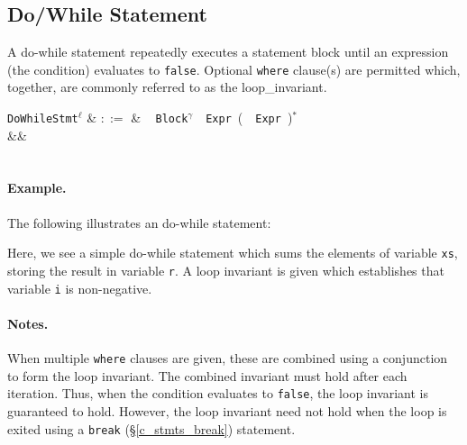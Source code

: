 
\subsection{Do/While Statement}
\label{c_stmts_do_while}
A do-while statement repeatedly executes a statement block until an expression (the condition) evaluates to \lstinline{false}.  Optional \lstinline{where} clause(s) are permitted which, together, are commonly referred to as the \gls{loop_invariant}.  

\begin{syntax}
  \verb+DoWhileStmt+$^\ell$ & $::=$ & \ \token{:}
  \verb+Block+$^\gamma$\ \ \verb+Expr+\ \big(\
  \ \verb+Expr+\ \big)$^*$\\
&&\\
\\
\end{syntax}

\paragraph{Example.} The following illustrates an do-while statement:



Here, we see a simple do-while statement which sums the elements of variable \lstinline{xs}, storing the result in variable \lstinline{r}.  A loop invariant is given which establishes that variable \lstinline{i} is non-negative.

\paragraph{Notes.}   When multiple \lstinline{where} clauses are given, these are combined using a conjunction to form the loop invariant.  The combined invariant must hold after each iteration.  Thus, when the condition evaluates to \lstinline{false}, the loop invariant is guaranteed to hold.  However, the loop invariant need not hold when the loop is exited using a \lstinline{break} (\S\ref{c_stmts_break}) statement.


